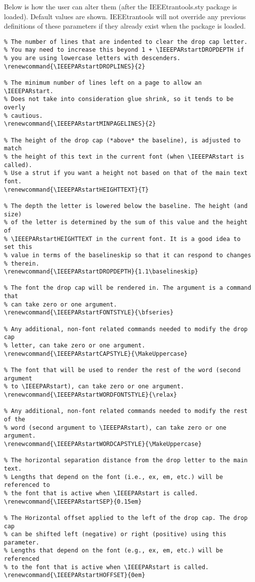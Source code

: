 \documentclass[pagesize=auto]{scrartcl}
\begin{document}
Below is how the user can alter them (after the \textsf{IEEEtrantools.sty} package
is loaded). Default values are shown. \textsf{IEEEtrantools} will not override
any previous definitions of these parameters if they already exist when
the package is loaded.
%
\begin{lstlisting}
% The number of lines that are indented to clear the drop cap letter.
% You may need to increase this beyond 1 + \IEEEPARstartDROPDEPTH if
% you are using lowercase letters with descenders.
\renewcommand{\IEEEPARstartDROPLINES}{2}

% The minimum number of lines left on a page to allow an \IEEEPARstart.
% Does not take into consideration glue shrink, so it tends to be overly
% cautious.
\renewcommand{\IEEEPARstartMINPAGELINES}{2}

% The height of the drop cap (*above* the baseline), is adjusted to match
% the height of this text in the current font (when \IEEEPARstart is called).
% Use a strut if you want a height not based on that of the main text font.
\renewcommand{\IEEEPARstartHEIGHTTEXT}{T}

% The depth the letter is lowered below the baseline. The height (and size)
% of the letter is determined by the sum of this value and the height of
% \IEEEPARstartHEIGHTTEXT in the current font. It is a good idea to set this
% value in terms of the baselineskip so that it can respond to changes
% therein.
\renewcommand{\IEEEPARstartDROPDEPTH}{1.1\baselineskip}

% The font the drop cap will be rendered in. The argument is a command that
% can take zero or one argument.
\renewcommand{\IEEEPARstartFONTSTYLE}{\bfseries}

% Any additional, non-font related commands needed to modify the drop cap
% letter, can take zero or one argument.
\renewcommand{\IEEEPARstartCAPSTYLE}{\MakeUppercase}

% The font that will be used to render the rest of the word (second argument
% to \IEEEPARstart), can take zero or one argument.
\renewcommand{\IEEEPARstartWORDFONTSTYLE}{\relax}

% Any additional, non-font related commands needed to modify the rest of the
% word (second argument to \IEEEPARstart), can take zero or one argument.
\renewcommand{\IEEEPARstartWORDCAPSTYLE}{\MakeUppercase}

% The horizontal separation distance from the drop letter to the main text.
% Lengths that depend on the font (i.e., ex, em, etc.) will be referenced to
% the font that is active when \IEEEPARstart is called.
\renewcommand{\IEEEPARstartSEP}{0.15em}

% The Horizontal offset applied to the left of the drop cap. The drop cap
% can be shifted left (negative) or right (positive) using this parameter.
% Lengths that depend on the font (e.g., ex, em, etc.) will be referenced
% to the font that is active when \IEEEPARstart is called.
\renewcommand{\IEEEPARstartHOFFSET}{0em}
\end{lstlisting}
\end{document}
